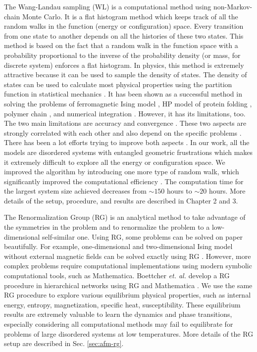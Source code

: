 The Wang-Landau sampling (WL) \cite{Wang2001} is a computational method using non-Markov-chain Monte Carlo. It is a flat histogram method which keeps track of all the random walks in the function (energy or configuration) space. Every transition from one state to another depends on all the histories of these two states. This method is based on the fact that a random walk in the function space with a probability proportional to the inverse of the probability density (or mass, for discrete system) enforces a flat histogram. In physics, this method is extremely attractive because it can be used to sample the density of states. The density of states can be used to calculate most physical properties using the partition function in statistical mechanics \cite{gould2010statistical}. It has been shown as a successful method in solving the problems of ferromagnetic Ising model \cite{landau2004new}, HP model of protein folding \cite{wust2008hp}, polymer chain \cite{taylor2009phase}, and numerical integration \cite{li2007numerical}. However, it has its limitations, too. The two main limitations are accuracy and convergence \cite{morozov2007accuracy}. These two aspects are strongly correlated with each other and also depend on the specific problems \cite{landau2014guide, wust2008hp}. There has been a lot efforts trying to improve both aspects \cite{schulz2003avoiding, schulz2003avoiding, troster2005wang}. In our work, all the models are disordered systems with entangled geometric frustrations which makes it extremely difficult to explore all the energy or configuration space. We improved the algorithm by introducing one more type of random walk, which significantly improved the computational efficiency \cite{cheng2015jamming}. The computation time for the largest system size achieved decreases from $\sim 150$ hours to $\sim 20$ hours. More details of the setup, procedure, and results are described in Chapter 2 and 3.


The Renormalization Group (RG) \cite{wilson1975renormalization} is an analytical method to take advantage of the symmetries in the problem and to renormalize the problem to a low-dimensional self-similar one. Using RG, some problems can be solved on paper beautifully. For example, one-dimensional and two-dimensional Ising model without external magnetic fields can be solved exactly using RG \cite{onsager1944}. However, more complex problems require computational implementations using modern symbolic computational tools, such as Mathematica.  Boettcher {\it et. al.} develop a RG procedure in hierarchical networks using RG and Mathematica \cite{boettcher2012ordinary, boettcher2011rgcp, BoHa11}. We use the same RG procedure to explore various equilibrium physical properties, such as internal energy, entropy, magnetization, specific heat, susceptibility. These equilibrium results are extremely valuable to learn the dynamics and phase transitions, especially considering all computational methods may fail to equilibrate for problems of large disordered systems at low temperatures. More details of the RG setup are described in Sec. \ref{sec:afm-rg}.










